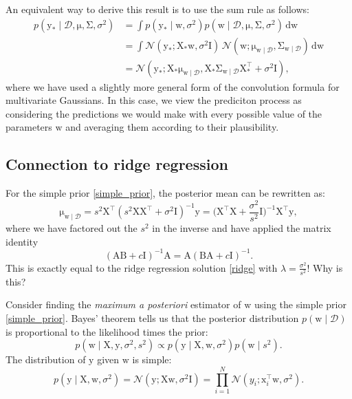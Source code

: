 \documentclass{article}
\newcommand{\given}{\mid}
\newcommand{\mc}[1]{\mathcal{#1}}
\newcommand{\data}{\mc{D}}
\newcommand{\intd}[1]{\,\mathrm{d}{#1}}
\newcommand{\inv}{^{-1}}
\newcommand{\trans}{^\top}
\newcommand{\mat}[1]{\bm{\mathrm{#1}}}
\renewcommand{\vec}[1]{\bm{\mathrm{#1}}}
\begin{document}
An equivalent way to derive this result is to use the sum rule as
follows:
\begin{align*}
  p(\vec{y}_\ast \given \data, \vec{\mu}, \mat{\Sigma}, \sigma^2)
  &=
  \int
  p(\vec{y}_\ast \given \vec{w}, \sigma^2)
  p(\vec{w} \given \data, \vec{\mu}, \mat{\Sigma}, \sigma^2)
  \intd{\vec{w}}
  \\
  &=
  \int
  \mc{N}(\vec{y}_\ast; \mat{X}_\ast \vec{w}, \sigma^2 \mat{I})
  \,
  \mc{N}(\vec{w}; \vec{\mu}_{\vec{w}\given\data}, \mat{\Sigma}_{\vec{w}\given\data})
  \intd{\vec{w}}
  \\
  &=
  \mc{N}(
  \vec{y}_\ast;
  \mat{X}_\ast \vec{\mu}_{\vec{w}\given\data},
  \mat{X}_\ast \mat{\Sigma}_{\vec{w}\given\data} \mat{X}_\ast\trans + \sigma^2 \mat{I}),
\end{align*}
where we have used a slightly more general form of the convolution
formula for multivariate Gaussians.  In this case, we view the
prediciton process as considering the predictions we would make with
every possible value of the parameters $\vec{w}$ and averaging them
according to their plausibility.

\subsection*{Connection to ridge regression}

For the simple prior \eqref{simple_prior}, the posterior mean
can be rewritten as:
\begin{equation*}
  \vec{\mu}_{\vec{w}\given\data}
  =
  s^2
  \mat{X}\trans
  (s^2\mat{X}\mat{X}\trans + \sigma^2 \mat{I})\inv
  \vec{y}
  =
  \biggl(\mat{X}\trans\mat{X} + \frac{\sigma^2}{s^2} \mat{I}\biggr)\inv
  \mat{X}\trans
  \vec{y},
\end{equation*}
where we have factored out the $s^2$ in the inverse and have applied
the matrix identity
\begin{equation*}
  (\mat{A}\mat{B} + c\mat{I})\inv \mat{A} =
  \mat{A}(\mat{B}\mat{A} + c \mat{I})\inv.
\end{equation*}
This is exactly equal to the ridge regression solution \eqref{ridge}
with $\lambda = \frac{\sigma^2}{s^2}$!  Why is this?

Consider finding the \emph{maximum a posteriori} estimator of
$\vec{w}$ using the simple prior \eqref{simple_prior}.
Bayes' theorem tells us that the posterior distribution $p(\vec{w}
\given \data)$ is proportional to the likelihood times the prior:
\begin{equation*}
  p(\vec{w} \given \mat{X}, \vec{y}, \sigma^2, s^2)
  \propto
  p(\vec{y} \given \mat{X}, \vec{w}, \sigma^2)
  p(\vec{w} \given s^2).
\end{equation*}
The distribution of $\vec{y}$ given $\vec{w}$ is simple:
\begin{equation*}
  p(\vec{y} \given \mat{X}, \vec{w}, \sigma^2)
  =
  \mc{N}(\vec{y}; \mat{X}\vec{w}, \sigma^2\mat{I})
  =
  \prod_{i = 1}^N
  \mc{N}(y_i; \vec{x}_i\trans\vec{w}, \sigma^2).
\end{equation*}
\end{document}
